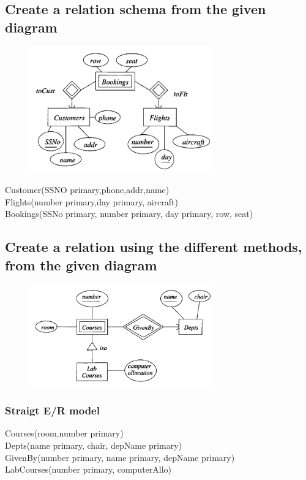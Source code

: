 \documentclass[12pt, a4paper]{article}
\begin{document}
			\subsection{Create a relation schema from the given diagram}
				\begin{figure}[h!]
						  \centering
						  \includegraphics[width=300px]{assets/W12E4.png}
				\end{figure}
		 		Customer(SSNO primary,phone,addr,name)\\
				Flights(number primary,day primary, aircraft)\\
				Bookings(SSNo primary, number primary, day primary, row, seat)
			\subsection{Create a relation using the different methods, from the given diagram}
				\begin{figure}[h!]
						  \centering
						  \includegraphics[width=300px]{assets/W12E5.png}
				\end{figure}
		 		\subsubsection{Straigt E/R model}
					Courses(room,number primary)\\
					Depts(name primary, chair, depName primary)\\
					GivenBy(number primary, name primary, depName primary)\\
					LabCourses(number primary, computerAllo)
\end{document}
